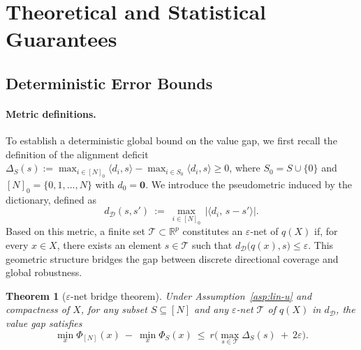 \documentclass[accepted]{uai2026}
\theoremstyle{plain}
\newtheorem{theorem}{Theorem}[section]
\theoremstyle{definition}
\theoremstyle{remark}
\newcommand{\R}{\mathbb{R}}
\begin{document}




\section{Theoretical and Statistical Guarantees}
\label{sec:theoretical-guarantees}

\subsection{Deterministic Error Bounds}
\label{sec:enet-bridge}

\paragraph{Metric definitions.}
To establish a deterministic global bound on the value gap, we first recall the definition of the alignment deficit $\Delta_S(s):=\max_{i\in [N]_0}\langle d_i,s\rangle-\max_{i\in S_0}\langle d_i,s\rangle\ge 0$, where $S_0=S\cup\{0\}$ and $[N]_0=\{0,1,\dots,N\}$ with $d_0=\bm 0$. We introduce the pseudometric induced by the dictionary, defined as
\begin{equation}\label{eq:dD}
d_{\mathcal D}(s,s')\ :=\ \max_{i\in [N]_0}\,|\langle d_i,\, s-s'\rangle|.
\end{equation}
Based on this metric, a finite set $\mathcal T\subset\R^p$ constitutes an $\varepsilon$-net of $q(X)$ if, for every $x\in X$, there exists an element $s\in\mathcal T$ such that $d_{\mathcal D}\big(q(x),s\big)\le \varepsilon$. This geometric structure bridges the gap between discrete directional coverage and global robustness.

\begin{theorem}[$\varepsilon$-net bridge theorem]\label{thm:enet-bridge}
Under Assumption~\ref{asp:lin-u} and compactness of $X$, for any subset $S\subseteq[N]$ and any $\varepsilon$-net $\mathcal T$ of $q(X)$ in $d_{\mathcal D}$, the value gap satisfies
\[
\min_{x}\Phi_{[N]}(x)\ -\ \min_{x}\Phi_{S}(x)
\ \le\ r\Big(\max_{s\in\mathcal T}\Delta_S(s)\ +\ 2\varepsilon\Big).
\]
\end{theorem}
\end{document}
